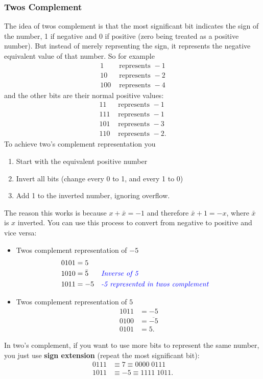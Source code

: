 \documentclass[10pt]{article}
\begin{document}
\subsubsection{Twos Complement}
The idea of twos complement is that the most significant bit indicates the sign of the number, 1 if negative and 0 if positive (zero being treated as a positive number). But instead of merely reprsenting the sign, it represents the negative equivalent value of that number.  So for example
\begin{align*}
  1 &\text{ represents } -1\\
  10 & \text{ represents } -2\\
  100 & \text{ represents } -4
\end{align*}
and the other bits are their normal positive values:
\begin{align*}
  11 &\text{ represents } -1\\
  111 & \text{ represents } -1\\  
  101 & \text{ represents } -3\\
  110 & \text{ represents } -2.
\end{align*}
To achieve two's complement representation you
\begin{enumerate}
\item Start with the equivalent positive number
\item Invert all bits (change every 0 to 1, and every 1 to 0)
\item Add 1 to the inverted number, ignoring overflow.
\end{enumerate}
The reason this works is because $x + \bar{x} = -1$ and therefore $\bar{x} + 1 = -x$, where $\bar{x}$ is $x$ inverted.  You can use this process to convert from negative to positive and vice versa:
\begin{itemize}
\item Twos complement representation of $-5$
\begin{align*}
  0101 &= 5\\
  1010 &= \bar{5} && \textit{\textcolor{blue}{Inverse of 5}}\\
  1011 &= -5 && \textit{\textcolor{blue}{-5 represented in twos complement}}
\end{align*}
\item Twos complement representation of $5$
  \begin{align*}
    1011 &= -5\\
    0100 &= \overline{-5}\\
    0101 &= 5.
  \end{align*}
\end{itemize}
In two's complement, if you want to use more bits to represent the same number, you just use \textbf{sign extension} (repeat the most significant bit):
\begin{align*}
  0111 &\equiv 7 \equiv 0000 \; 0111\\
  1011 &\equiv -5 \equiv 1111 \;  1011.
\end{align*}
\end{document}
